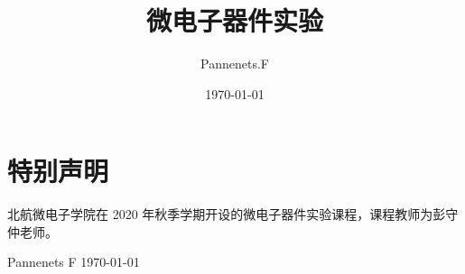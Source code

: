 \documentclass[cn,11pt,chinese,black,simple]{elegantbook}
\title{微电子器件实验}
\author{Pannenets.F}
\date{\today}
\begin{document}
\maketitle
\frontmatter

\chapter*{特别声明}

北航微电子学院在 2020 年秋季学期开设的微电子器件实验课程，课程教师为彭守仲老师。

% 

\begin{flushright}
Pannenets F
\today
\end{flushright}

\tableofcontents

\mainmatter
\end{document}
